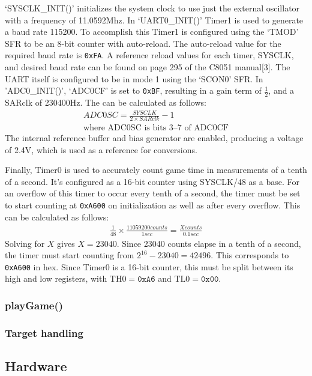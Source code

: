 \documentclass[12pt]{article}
\begin{document}
`SYSCLK\_INIT()' initializes the system clock to use just the external oscillator with a frequency of 11.0592\si{Mhz}. In `UART0\_INIT()' Timer1 is used to generate a baud rate 115200. To accomplish this Timer1 is configured using the `TMOD' SFR to be an 8-bit counter with auto-reload. The auto-reload value for the required baud rate is \texttt{0xFA}. A reference reload values for each timer, SYSCLK, and desired baud rate can be found on page 295 of the C8051 manual[3]. The UART itself is configured to be in mode 1 using the `SCON0' SFR. In 'ADC0\_INIT()', `ADC0CF' is set to \texttt{0xBF}, resulting in a gain term of $\frac{1}{2}$, and a SARclk of 230400\si{Hz}. The can be calculated as follows: 
\begin{gather*}
ADC0SC=\frac{SYSCLK}{2\times SARclk}-1\\
\textrm{where ADC0SC is bits 3--7 of ADC0CF}
\end{gather*}
The internal reference buffer and bias generator are enabled, producing a voltage of 2.4\si{V}, which is used as a reference for conversions. 

Finally, Timer0 is used to accurately count game time in measurements of a tenth of a second. It's configured as a 16-bit counter using SYSCLK/48 as a base. For an overflow of this timer to occur every tenth of a second, the timer must be set to start counting at \texttt{0xA600} on initialization as well as after every overflow. This can be calculated as follows:
\begin{gather*}
\frac{1}{48}\times \frac{11059200 \si{counts}}{\si{1}{sec}}=\frac{X\si{counts}}{0.1\si{sec}}
\end{gather*}
Solving for $X$ gives $X=23040$. Since 23040 counts elapse in a tenth of a second, the timer must start counting from $2^{16}-23040=42496$. This corresponds to \texttt{0xA600} in hex. Since Timer0 is a 16-bit counter, this must be split between its high and low registers, with $\mathrm{TH0}=\texttt{0xA6}$ and $\mathrm{TL0}=\texttt{0x00}$.

\subsubsection{playGame()}


\subsubsection{Target handling}


\subsection{Hardware}
\end{document}
